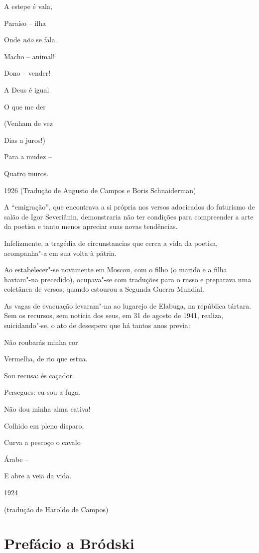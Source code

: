 A estepe é vala,

Paraíso -- ilha

Onde \emph{não} se fala.

Macho -- animal!

Dono -- vender!

A Deus é igual

O que me der

(Venham de vez

Dias a juros!)

Para a mudez --

Quatro muros.

1926 (Tradução de Augusto de Campos e Boris Schnaiderman)

A ``emigração'', que encontrava a si própria nos versos adocicados do
futurismo de salão de Igor Severiânin, demonstraria não ter condições
para compreender a arte da poetisa e tanto menos apreciar suas novas
tendências.

Infelizmente, a tragédia de circunstancias que cerca a vida da poetisa,
acompanha"-a em sua volta à pátria.

Ao estabelecer"-se novamente em Moscou, com o filho (o marido e a filha
haviam"-na precedido), ocupava"-se com traduções para o russo e preparava
uma coletânea de versos, quando estourou a Segunda Guerra Mundial.

As vagas de evacuação levaram"-na ao lugarejo de Elabuga, na república
tártara. Sem os recursos, sem notícia dos seus, em 31 de agosto de 1941,
realiza, suicidando"-se, o ato de desespero que há tantos anos previa:

Não roubarás minha cor

Vermelha, de rio que estua.

Sou recusa: és caçador.

Persegues: eu sou a fuga.

Não dou minha alma cativa!

Colhido em pleno disparo,

Curva a pescoço o cavalo

Árabe --

E abre a veia da vida.

1924

(tradução de Haroldo de Campos)

\chapter{Prefácio a Bródski}

